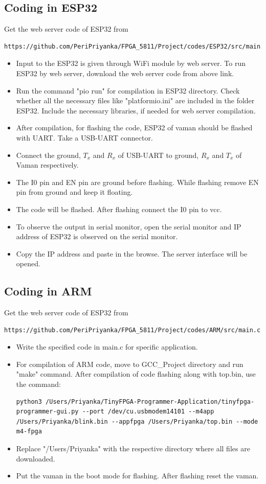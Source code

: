 \documentclass[journal,12pt,twocolumn]{IEEEtran}
\begin{document}
\subsection{Coding in ESP32}
Get the web server code of ESP32 from
\begin{lstlisting}
https://github.com/PeriPriyanka/FPGA_5811/Project/codes/ESP32/src/main.cpp
\end{lstlisting}
\begin{itemize}
\item Input to the ESP32 is given through WiFi module by web server. To run ESP32 by web server, download the web server code from above link.
\item Run the command "pio run" for compilation in ESP32 directory. Check whether all the necessary files like "platformio.ini" are included in the folder ESP32. Include the necessary libraries, if needed for web server compilation.
\item After compilation, for flashing the code, ESP32 of vaman should be flashed with UART. Take a USB-UART connector. 
\item Connect the ground, $T_x$ and $R_x$ of USB-UART to ground, $R_x$ and $T_x$ of Vaman respectively. 
\item The I0 pin and EN pin are ground before flashing. While flashing remove EN pin from ground and keep it floating. 
\item The code will be flashed. After flashing connect the I0 pin to vcc. 
\item To observe the output in serial monitor, open the serial monitor and IP address of ESP32 is observed on the serial monitor. 
\item Copy the IP address and paste  in the browse. The server interface will be opened. 
\end{itemize}
\subsection{Coding in ARM}
Get the web server code of ESP32 from
\begin{lstlisting}
https://github.com/PeriPriyanka/FPGA_5811/Project/codes/ARM/src/main.c
\end{lstlisting}
\begin{itemize}
\item Write the specified code in main.c for specific application. 
\item For compilation of ARM code, move to GCC\_Project directory and run "make" command. After compilation of code flashing along with top.bin, use the command: 
\begin{lstlisting}
python3 /Users/Priyanka/TinyFPGA-Programmer-Application/tinyfpga-programmer-gui.py --port /dev/cu.usbmodem14101 --m4app /Users/Priyanka/blink.bin --appfpga /Users/Priyanka/top.bin --mode m4-fpga
\end{lstlisting}
\item Replace "/Users/Priyanka" with the respective directory where all files are downloaded.
\item Put the vaman in the boot mode for flashing. After flashing reset the vaman.
\end{itemize}
\end{document}
